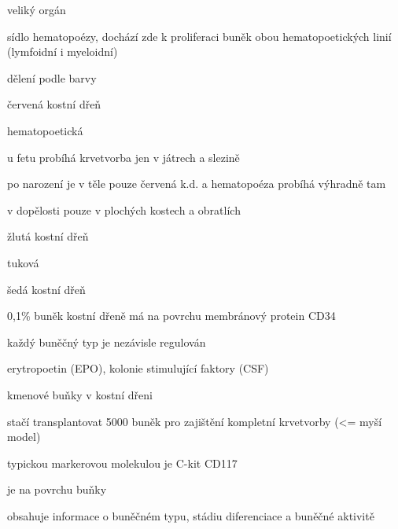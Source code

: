 \documentclass[DIV=8]{scrreprt}
\begin{document}
\begin{myItemize}[nosep]
    \item veliký orgán
    \item sídlo hematopoézy, dochází zde k proliferaci buněk obou hematopoetických linií (lymfoidní i myeloidní)
    \item dělení podle barvy
\begin{myItemize}[nosep]
    \item červená kostní dřeň
\begin{myItemize}[nosep]
    \item hematopoetická
    \item u fetu probíhá krvetvorba jen v játrech a slezině
    \item po narození je v těle pouze červená k.d. a hematopoéza probíhá výhradně tam
    \item v dopělosti pouze v plochých kostech a obratlích
\end{myItemize}

    \item žlutá kostní dřeň
\begin{myItemize}[nosep]
    \item tuková
\end{myItemize}

    \item šedá kostní dřeň
\end{myItemize}

    \item 0,1\% buněk kostní dřeně má na povrchu membránový protein CD34
    \item každý buněčný typ je nezávisle regulován
\begin{myItemize}[nosep]
    \item erytropoetin (EPO), kolonie stimulující faktory (CSF)
\end{myItemize}

    \item kmenové buňky v kostní dřeni
\begin{myItemize}[nosep]
    \item stačí transplantovat 5000 buněk pro zajištění kompletní krvetvorby (<= myší model)
\end{myItemize}

    \item typickou markerovou molekulou je C-kit CD117
\begin{myItemize}[nosep]
    \item je na povrchu buňky
    \item obsahuje informace o buněčném typu, stádiu diferenciace a buněčné aktivitě
\end{myItemize}

\end{myItemize}
\end{document}
